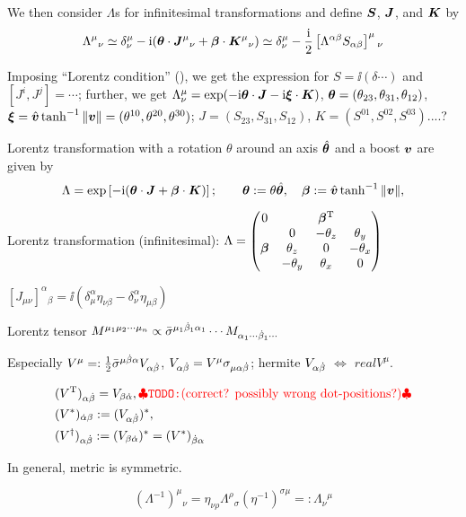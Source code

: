 \documentclass[CheatSheet]{subfiles}
\begin{document}
We then consider $\Lambda$s for infinitesimal transformations and define ${\boldsymbol{S}}$, ${\boldsymbol{J}}$, and ${\boldsymbol{K}}$ by
\begin{align}
 \Lambda^\mu{}_\nu
  \simeq \delta^\mu_\nu-\mathrm{i}({\boldsymbol{\theta}}\cdot{\boldsymbol{J}}^\mu{}_\nu+{\boldsymbol{\beta}}\cdot{\boldsymbol{K}}^\mu{}_\nu)
  \simeq \delta^\mu_\nu-\frac{\mathrm{i}}{2}  \left[\Lambda^{\alpha\beta}S_{\alpha\beta}\right]^\mu{}_\nu
\end{align}

Imposing ``Lorentz condition'' (), we get the expression for $S=\ii(\delta\cdots)$ and $[J^i,J^j]=\cdots$; further, we get $\Lambda^{\mu}_{\nu}=\exp(-\mathrm{i}{\boldsymbol{\theta}}\cdot{\boldsymbol{J}} -\mathrm{i} {\boldsymbol{\xi}}\cdot{\boldsymbol{K}})$, ${\boldsymbol{\theta}}=(\theta_{23},\theta_{31}, \theta_{12})$, ${\boldsymbol{\xi}} = \hat{{\boldsymbol{v}}}\tanh^{-1}\|{\boldsymbol{v}}\|=(\theta^{10},\theta^{20},\theta^{30})$; $J=(S_{23},S_{31},S_{12})$, $K=(S^{01}, S^{02}, S^{03})$....?




Lorentz transformation with a rotation $\theta$ around an axis $\hat{{\boldsymbol{\theta}}}$ and a boost ${\boldsymbol{v}}$ are given by
\begin{equation}
 \Lambda = \exp\left[-\mathrm{i}({\boldsymbol{\theta}}\cdot{\boldsymbol{J}}+{\boldsymbol{\beta}}\cdot {\boldsymbol{K}})\right];
\qquad
{\boldsymbol{\theta}}:=\theta\hat{{\boldsymbol{\theta}}}, \quad {\boldsymbol{\beta}} := \hat{{\boldsymbol{v}}}\tanh^{-1}\|{\boldsymbol{v}}\|,
\end{equation}


Lorentz transformation (infinitesimal):
$\Lambda=\begin{pmatrix}
  0 &   & {\boldsymbol{\beta}}^{\mathrm{T}} & \\
    & 0 &-\theta_z & \theta_y\\
  {\boldsymbol{\beta}} & \theta_z & 0 & -\theta_x \\
   & -\theta_y & \theta_x & 0
\end{pmatrix}$

$[J_{\mu\nu}]^{\alpha}{}_{\beta}=
 \ii(\delta^\alpha_\mu\eta_{\nu\beta}-\delta^\alpha_\nu\eta_{\mu\beta})
$

\vspace{2em}

Lorentz tensor $
M^{\mu_1\mu_2\cdots\mu_n}\propto
\bar\sigma^{\mu_1{\dot\beta}_1\alpha_1}\cdots M_{\alpha_1\cdots{\dot\beta}_1\cdots}
$

Especially
$V^\mu =: \frac12 \bar\sigma^{\mu{\dot\beta}\alpha}V_{\alpha{\dot\beta}}$,
$V_{\alpha{\dot\beta}}=V^\mu\sigma_{\mu\alpha{\dot\beta}}$; hermite $V_{\alpha{\dot\beta}}$ $\Leftrightarrow$ $real V^\mu$.

\begin{align}
 &(V^{\mathrm{T}})_{\alpha{\dot\beta}} = V_{\beta{\dot\alpha}},\text{{\color{red}{$\clubsuit$\texttt{TODO:}(correct? possibly wrong dot-positions?)$\clubsuit$}}}\\
 &(V^*)_{{\dot\alpha}\beta}:= (V_{\alpha{\dot\beta}})^*,\\
 &(V^\dagger)_{\alpha{\dot\beta}} := (V_{\beta{\dot\alpha}})^* = (V^*)_{{\dot\beta}\alpha}
\end{align}


In general, metric is symmetric.

\begin{equation}
 (\Lambda^{-1})^\mu{}_\nu = \eta_{\nu\rho}\Lambda^{\rho}{}_\sigma(\eta^{-1})^{\sigma\mu}=:\Lambda_\nu{}^\mu
\end{equation}
\end{document}
